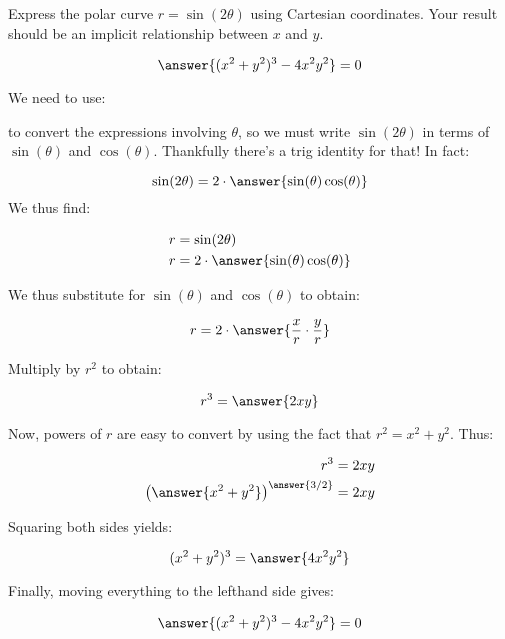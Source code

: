\documentclass{ximera}
\author{Jim Talamo }
\begin{document}
\begin{exercise}

Express the polar curve $r= \sin(2\theta)$ using Cartesian coordinates.  Your result should be an implicit relationship between $x$ and $y$.

\[
\answer{(x^2+y^2)^3-4x^2y^2} = 0
\]

\begin{hint}
We need to use:

\begin{multipleChoice}
\end{multipleChoice}

to convert the expressions involving $\theta$, so we must write $\sin(2\theta)$ in terms of $\sin(\theta)$ and $\cos(\theta)$.  Thankfully there's a trig identity for that!  In fact:

\[
\sin(2\theta) = 2 \cdot  \answer{ \sin(\theta)\cos(\theta)}
\]
We thus find:

\begin{align*}
r &=   \sin(2\theta) \\
r & =  2 \cdot \answer{ \sin(\theta)\cos(\theta)}
\end{align*}

\begin{question}
We thus substitute for $\sin(\theta)$ and $\cos(\theta)$ to obtain:

\[
r =2 \cdot \answer{\frac{x}{r} \cdot \frac{y}{r}}
\]

Multiply by $r^2$ to obtain:

\[
r^3 = \answer{2xy}
\]

\begin{question}
Now, powers of $r$ are easy to convert by using the fact that $r^2 = x^2+y^2$.  Thus:

\begin{align*}
r^3 &= 2xy\\
\left(\answer{x^2+y^2}\right)^{\answer{3/2}} &= 2xy
\end{align*}

Squaring both sides yields:

\[
(x^2+y^2)^3 = \answer{4x^2y^2}
\]

Finally, moving everything to the lefthand side gives:

\[
\answer{(x^2+y^2)^3-4x^2y^2} = 0
\]
\end{question}
\end{question}

\end{hint}

\end{exercise}
\end{document}
